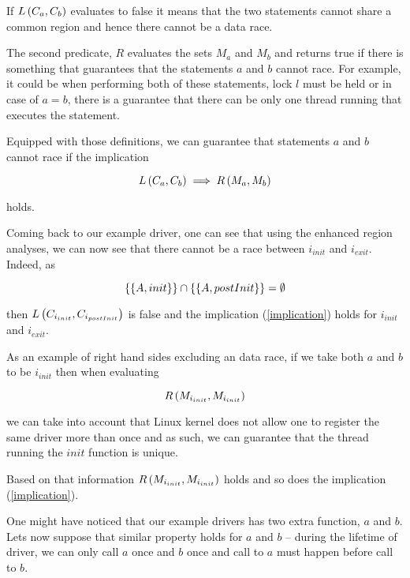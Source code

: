 \documentclass[..thesis.tex]{subfiles}
\begin{document}
If $L \left( C_a, C_b \right)$ evaluates to false it means that the two statements cannot share a common region and hence there cannot be a data race. 

The second predicate, $R$ evaluates the sets $M_a$ and $M_b$ and returns true if there is something that guarantees that the statements $a$ and $b$ cannot race.
For example, it could be when performing both of these statements, lock $l$ must be held or in case of $a=b$,
there is a guarantee that there can be only one thread running that executes the statement.

Equipped with those definitions, we can guarantee that statements $a$ and $b$ cannot race if the implication

\begin{equation}
\label{implication}
L \left( C_a, C_b \right) \implies R \left( M_a, M_b \right)  
\end{equation}

holds.

Coming back to our example driver, one can see that using the enhanced region analyses, we can now see that there cannot be a race between $i_{init}$ and $i_{exit}$.
Indeed, as

\begin{equation*}
 \left\lbrace \left\lbrace A, init \right\rbrace \right\rbrace \cap  \left\lbrace \left\lbrace A, postInit \right\rbrace \right\rbrace = \emptyset
\end{equation*}

then $L \left( C_{i_{init}}, C_{i_{postInit}} \right)$ is false and the implication (\ref{implication}) holds for $i_{init}$ and $i_{exit}$.

As an example of right hand sides excluding an data race, if we take both $a$ and $b$ to be $i_{init}$ then when evaluating 

\begin{equation*}
R \left( M_{i_{init}}, M_{i_{init}} \right)
\end{equation*} 

we can take into account that Linux kernel does not allow one to register the same driver more than once and as such,
we can guarantee that the thread running the $init$ function is unique.

Based on that information $R \left( M_{i_{init}}, M_{i_{init}} \right)$ holds and so does the implication (\ref{implication}).


One might have noticed that our example drivers has two extra function, $a$ and $b$. Lets now suppose that similar property holds for $a$ and $b$ --
during the lifetime of driver, we can only call $a$ once and $b$ once and call to $a$  must happen before call to $b$.
\end{document}
